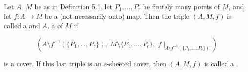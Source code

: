 Let $A$, $M$ be as in Definition 5.1, let $P_1, \ldots, P_r$ be finitely many points of $M$, and let $f \colon A \to M$ be a (not necessarily onto) map. Then the triple $(A, M, f)$ is called a  and $A$, a  of $M$ if

$$
\left(A \setminus f^{-1}(\{P_1, \ldots, P_r\}),\; M \setminus \{P_1, \ldots, P_r\},\; f \mid_{A \setminus f^{-1}(\{P_1, \ldots, P_r\})}\right)
$$

is a cover. If this last triple is an $s$-sheeted cover, then $(A, M, f)$ is called a .
